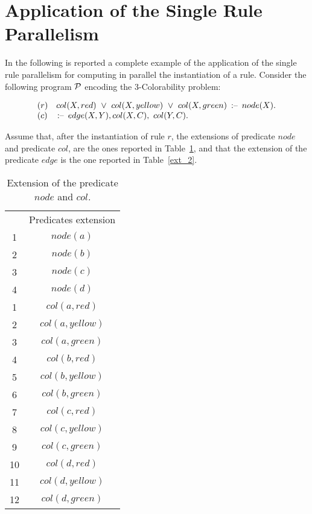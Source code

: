 \documentclass[preprint]{tlp}
\newcommand{\Or}{\ensuremath{\vee}}
\newcommand{\derives}{\ensuremath{\mbox{\,$:$--}\,}\xspace}
\newcommand{\p}{\ensuremath{{\cal P}}\xspace}
\newenvironment{dlvcode}
  {\begin{displaymath}\begin{array}{l}}
  {\end{array}\end{displaymath}}
\begin{document}
\section{Application of the Single Rule Parallelism}
\label{AppSingleRule}

In the following is reported a complete example of the application of the single rule parallelism for computing
in parallel the instantiation of a rule.
Consider the following program \p encoding the 3-Colorability problem:

\begin{small}
\begin{dlvcode}
(r)\ \ \ col(X,red)\ \Or\ col(X,yellow)\ \Or\ col(X,green)\ \derives\ node(X). \\
(c)\ \ \ \derives\ edge(X,Y), col(X,C),\ col(Y,C).
\end{dlvcode}
\end{small}

Assume that, after the instantiation of rule $r$, 
the extensions of predicate $node$ and predicate $col$, are the ones reported in Table~\ref{ext_1}, and 
that the extension of the predicate $edge$ is the one reported in Table~\ref{ext_2}.

\begin{table}[h!]
 \begin{tabular}{|c|c|}
  \cline{1-2}
  & Predicates extension \\
  \cline{1-2}
1&$node(a)$ \\
2&$node(b)$ \\
3&$node(c)$ \\
4&$node(d)$ \\
\cline{1-2}
\cline{1-2}
1 & $col(a,red)$ \\
2 & $col(a,yellow)$ \\ 
3 & $col(a,green)$ \\
4 & $col(b,red)$ \\
5 & $col(b,yellow)$ \\
6 & $col(b,green)$ \\
7 & $col(c,red)$ \\
8 & $col(c,yellow)$ \\
9 & $col(c,green)$\\
10 & $col(d,red)$\\
11 & $col(d,yellow)$\\
12 & $col(d,green)$ \\
  \cline{1-2}
 \end{tabular} 
\caption{Extension of the predicate $node$ and $col$.}
\label{ext_1}
\end{table}
\end{document}

